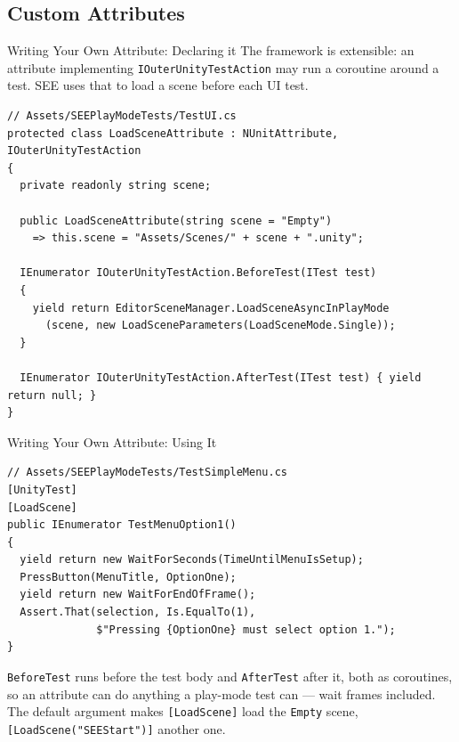 \subsection{Custom Attributes}

\begin{frame}[fragile]{Writing Your Own Attribute: Declaring it}
  The framework is extensible: an attribute implementing
  \texttt{IOuterUnityTestAction} may run a coroutine around a test. SEE uses
  that to load a scene before each UI test.
  \vspace{1ex}

  \begin{lstlisting}[basicstyle=\scriptsize\ttfamily]
// Assets/SEEPlayModeTests/TestUI.cs
protected class LoadSceneAttribute : NUnitAttribute, IOuterUnityTestAction
{
  private readonly string scene;

  public LoadSceneAttribute(string scene = "Empty")
    => this.scene = "Assets/Scenes/" + scene + ".unity";

  IEnumerator IOuterUnityTestAction.BeforeTest(ITest test)
  {
    yield return EditorSceneManager.LoadSceneAsyncInPlayMode
      (scene, new LoadSceneParameters(LoadSceneMode.Single));
  }

  IEnumerator IOuterUnityTestAction.AfterTest(ITest test) { yield return null; }
}
  \end{lstlisting}
\end{frame}

\begin{frame}[fragile]{Writing Your Own Attribute: Using It}
  \begin{lstlisting}[basicstyle=\scriptsize\ttfamily]
// Assets/SEEPlayModeTests/TestSimpleMenu.cs
[UnityTest]
[LoadScene]
public IEnumerator TestMenuOption1()
{
  yield return new WaitForSeconds(TimeUntilMenuIsSetup);
  PressButton(MenuTitle, OptionOne);
  yield return new WaitForEndOfFrame();
  Assert.That(selection, Is.EqualTo(1),
              $"Pressing {OptionOne} must select option 1.");
}
  \end{lstlisting}
  \vspace{1ex}

  \texttt{BeforeTest} runs before the test body and \texttt{AfterTest} after
  it, both as coroutines, so an attribute can do anything a play-mode test can
  --- wait frames included. The default argument makes \texttt{[LoadScene]}
  load the \texttt{Empty} scene, \texttt{[LoadScene("SEEStart")]} another one.
  \vspace{1ex}

\end{frame}


